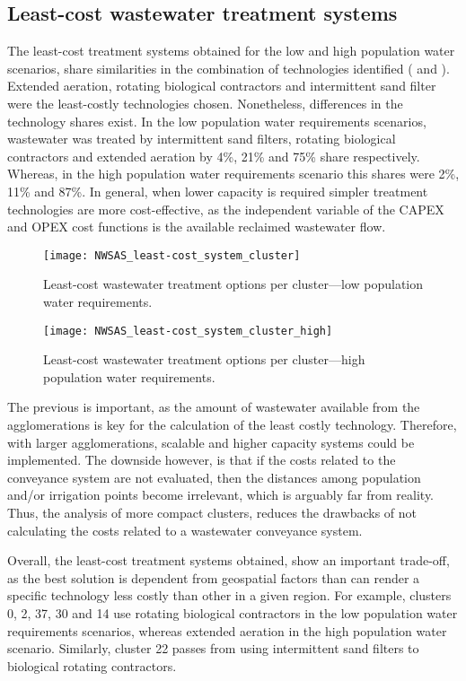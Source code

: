 \subsection{Least-cost wastewater treatment systems}
The least-cost treatment systems obtained for the low and high population water scenarios, share similarities in the combination of technologies identified ( and ). Extended aeration, rotating biological contractors and intermittent sand filter were the least-costly technologies chosen. Nonetheless, differences in the technology shares exist. In the low population water requirements scenarios, wastewater was treated by intermittent sand filters, rotating biological contractors and extended aeration by 4\%, 21\% and 75\% share respectively. Whereas, in the high population water requirements scenario this shares were 2\%, 11\% and 87\%. In general, when lower capacity is required simpler treatment technologies are more cost-effective, as the independent variable of the CAPEX and OPEX cost functions is the available reclaimed wastewater flow.

\begin{figure*}[!ht]
	\centering
	\texttt{[image: NWSAS\_least-cost\_system\_cluster]}
	\caption{Least-cost wastewater treatment options per cluster---low population water requirements.}
	\label{fig:leastLow}
\end{figure*}

\begin{figure*}[!ht]
	\centering
	\texttt{[image: NWSAS\_least-cost\_system\_cluster\_high]}
	\caption{Least-cost wastewater treatment options per cluster---high population water requirements.}
	\label{fig:leastHigh}
\end{figure*}

The previous is important, as the amount of wastewater available from the agglomerations is key for the calculation of the least costly technology. Therefore, with larger agglomerations, scalable and higher capacity systems could be implemented. The downside however, is that if the costs related to the conveyance system are not evaluated, then the distances among population and/or irrigation points become irrelevant, which is arguably far from reality. Thus, the analysis of more compact clusters, reduces the drawbacks of not calculating the costs related to a wastewater conveyance system.

Overall, the least-cost treatment systems obtained, show an important trade-off, as the best solution is dependent from geospatial factors than can render a specific technology less costly than other in a given region. For example, clusters 0, 2, 37, 30 and 14 use rotating biological contractors in the low population water requirements scenarios, whereas extended aeration in the high population water scenario. Similarly, cluster 22 passes from using intermittent sand filters to biological rotating contractors.

